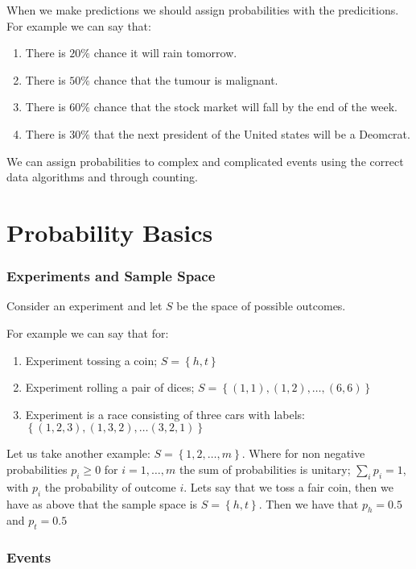 When we make predictions we should assign probabilities with the predicitions. For example we can say that:

\begin{enumerate}
	\item There is $20\%$ chance it will rain tomorrow.
	\item There is $50\%$ chance that the tumour is malignant. 
	\item There is $60\%$ chance that the stock market will fall by the end of the week. 
	\item There is $30\%$ that the next president of the United states will be a Deomcrat. 
\end{enumerate}

We can assign probabilities to complex and complicated events using the correct data algorithms and through counting. 

\section{Probability Basics}
 
\subsubsection{Experiments and Sample Space}

Consider an experiment and let $S$ be the space of possible outcomes. 

For example we can say that for:

\begin{enumerate}
	\item Experiment tossing a coin; $S = \left\{ h,t \right\}$
	\item Experiment rolling a pair of dices; $S = \left\{ (1,1), (1,2), \dots , (6,6) \right\}$
	\item Experiment is a race consisting of three cars with labels: $\left\{ (1,2,3), (1,3,2), \dots (3,2,1) \right\}$ 
\end{enumerate}

Let us take another example: $S = \left\{ 1, 2, \dots, m \right\}$. Where for non negative probabilities $p_i \geq 0$ for $i = 1 ,\dots ,m$ the sum of probabilities is unitary; $\sum_i p_i = 1$, with $p_i$ the probability of outcome $i$. Lets say that we toss a fair coin, then we have as above that the sample space is $S = \left\{ h,t \right\}$. Then we have that $p_h = 0.5$ and $p_t = 0.5$

\subsubsection{Events}

